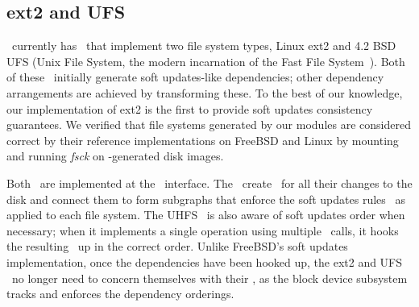 \begin{comment}
An example configuration taking advantage of this ability could be a file
system image mounted with an external journal, both of which are loopback block
devices stored on the root file system (which could use soft updates). The
journaled file system's ordering requirements are sent through the loopback
device as \chdescs, allowing dependency information to be maintained across
boundaries that might otherwise lose that information. In contrast, without
\chdescs\ and the ability to forward \chdescs\ through loopback devices, BSD
cannot express soft updates' consistency requirements through loopback devices.
Although the use of a loopback device is somewhat contrived in the example,
they are increasingly being used in conventional operating systems. For
instance, Mac OS X uses them in order to allow users to encrypt their home
directories.
\end{comment}

\subsection{ext2 and UFS}

\Kudos\ currently has \modules\ that implement two file system types, Linux
ext2 and 4.2 BSD UFS (Unix File System, the modern incarnation of the Fast File
System~\cite{mckusick84fast}).
%
Both of these \modules\ initially generate soft updates-like dependencies; other
dependency arrangements are achieved by transforming these.
%
%
To the best of our knowledge, our implementation of ext2 is the first to provide
soft updates consistency guarantees.
%
%
%
We verified that file systems generated by our modules are considered
correct by their reference implementations on FreeBSD and Linux by mounting
and running \emph{fsck} on \Kudos-generated disk images.

Both \modules\ are implemented at the \LFS\ interface. 
%
%
The \modules\ create \chdescs\ for all their changes to the disk and
connect them to form subgraphs that enforce the soft updates
rules~\cite{ganger00soft} as applied to each file system. 
%
The UHFS \module\ is also aware of soft updates order when necessary; when
it implements a single operation using multiple \LFS\ calls, it hooks the
resulting \patches\ up in the correct order.
%
Unlike FreeBSD's soft updates implementation, once the dependencies have
been hooked up, the ext2 and UFS \modules\ no longer need to concern
themselves with their \chdescs, as the block device subsystem tracks and
enforces the dependency orderings.

